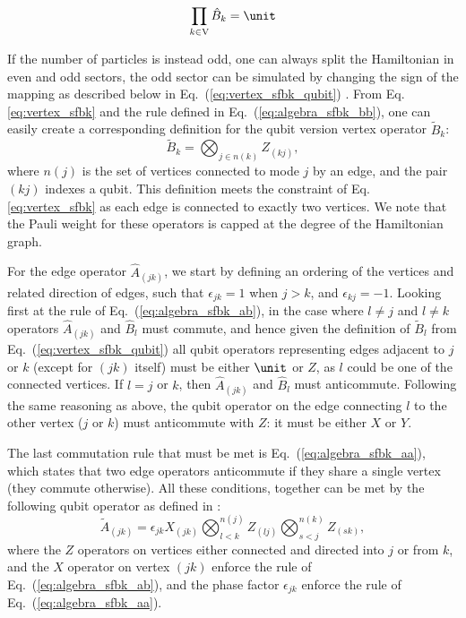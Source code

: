 \begin{equation} \label{eq:vertex_sfbk}
\begin{aligned}
\prod_{k \in \mathrm{V}} \hat{B}_k = \unit
\end{aligned}
\end{equation}

If the number of particles is instead odd, one can always split the Hamiltonian in even and odd sectors, the odd sector can be simulated by changing the sign of the mapping as described below in Eq.~(\ref{eq:vertex_sfbk_qubit}) \cite{Jiang2019}. From Eq. \ref{eq:vertex_sfbk} and the rule defined in  Eq.~(\ref{eq:algebra_sfbk_bb}), one can easily create a corresponding definition for the qubit version vertex operator $\tilde{B}_k$:
\begin{equation}\label{eq:vertex_sfbk_qubit}
\tilde{B}_{k} =\bigotimes_{j \in n(k)} Z_{(k j)},
\end{equation}
where $n(j)$ is the set of vertices connected to mode $j$ by an edge, and the pair $(kj)$ indexes a qubit. This definition meets the constraint of Eq. \ref{eq:vertex_sfbk} as each edge is connected to exactly two vertices. We note that the Pauli weight for these operators is capped at the degree of the Hamiltonian graph. 

For the edge operator $\hat{A}_{(jk)}$, we start by defining an ordering of the vertices and related direction of edges, such that $\epsilon_{jk} = 1$ when $j > k$, and $\epsilon_{kj} = - 1$. Looking first at the rule of Eq.~(\ref{eq:algebra_sfbk_ab}), in the case where $l \neq j$ and $l \neq k$ operators $\hat{A}_{(jk)}$ and $\hat{B}_{l}$ must commute, and hence given the definition of $\tilde{B}_{l}$ from Eq.~(\ref{eq:vertex_sfbk_qubit}) all qubit operators representing edges adjacent to $j$ or $k$ (except for $(jk)$ itself) must be either $\unit$ or $Z$, as $l$ could be one of the connected vertices. 
If $l = j$ or $k$, then $\hat{A}_{(jk)}$ and $\hat{B}_{l}$  must anticommute. Following the same reasoning as above, the qubit operator on the edge connecting $l$ to the other vertex ($j$ or $k$) must anticommute with $Z$: it must be either $X$ or $Y$. 

The last commutation rule that must be met is Eq.~(\ref{eq:algebra_sfbk_aa}), which states that two edge operators anticommute if they share a single vertex (they commute otherwise). All these conditions, together can be met by the following qubit operator as defined in \cite{Bravyi2002, Havlek2017, Setia2018}:
\begin{equation}
\tilde{A}_{(j k)} =\epsilon_{j k} X_{(j k)} \bigotimes_{l < k}^{n(j)} Z_{(l j)} \bigotimes_{s < j}^{n(k)} Z_{(s k)},
\end{equation}
where the $Z$ operators on vertices either connected and directed into $j$ or from $k$, and the $X$ operator on vertex $(jk)$ enforce the rule of Eq.~(\ref{eq:algebra_sfbk_ab}), and the phase factor $\epsilon_{j k}$ enforce the rule of Eq.~(\ref{eq:algebra_sfbk_aa}).

